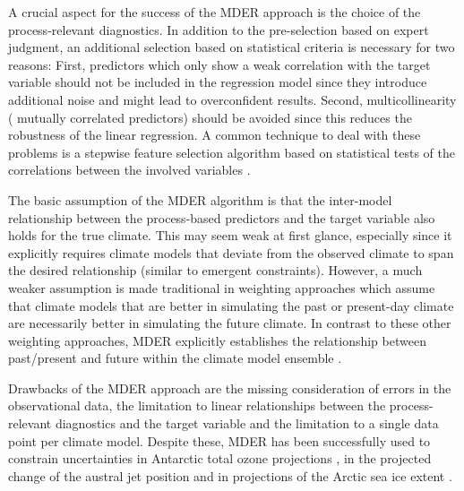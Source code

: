 A crucial aspect for the success of the \ac{MDER} approach is the choice of the
process-relevant diagnostics. In addition to the pre-selection based on expert
judgment, an additional selection based on statistical criteria is necessary
for two reasons: First, predictors which only show a weak correlation with the
target variable should not be included in the regression model since they
introduce additional noise and might lead to overconfident results. Second,
multicollinearity (\ie{} mutually correlated predictors) should be avoided
since this reduces the robustness of the linear regression. A common technique
to deal with these problems is a stepwise feature selection algorithm based on
statistical tests of the correlations between the involved variables
\autocite{Karpechko2013}.

The basic assumption of the \ac{MDER} algorithm is that the inter-model
relationship between the process-based predictors and the target variable also
holds for the true climate. This may seem weak at first glance, especially
since it explicitly requires climate models that deviate from the observed
climate to span the desired relationship (similar to emergent constraints).
However, a much weaker assumption is made traditional in weighting approaches
which assume that climate models that are better in simulating the past or
present-day climate are necessarily better in simulating the future climate. In
contrast to these other weighting approaches, \ac{MDER} explicitly establishes
the relationship between past/present and future within the climate model
ensemble \autocite{Karpechko2013}.

Drawbacks of the \ac{MDER} approach are the missing consideration of errors in
the observational data, the limitation to linear relationships between the
process-relevant diagnostics and the target variable and the limitation to a
single data point per climate model. Despite these, \ac{MDER} has been
successfully used to constrain uncertainties in Antarctic total ozone
projections \autocite{Karpechko2013}, in the projected change of the austral
jet position \autocite{Wenzel2016a} and in projections of the Arctic sea ice
extent \autocite{Senftleben2020}.
